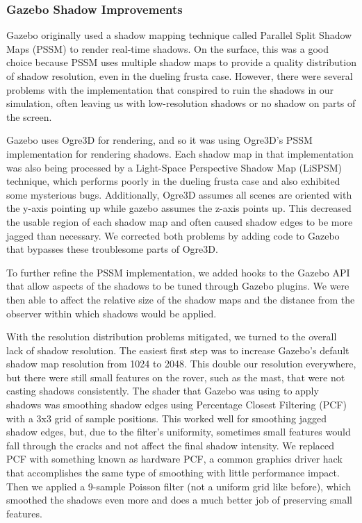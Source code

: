 \documentclass[twocolumn,letterpaper]{IEEEAerospaceCLS}  %
\begin{document}
\subsubsection{Gazebo Shadow Improvements}
Gazebo originally used a shadow mapping technique called Parallel Split Shadow Maps (PSSM) to render real-time shadows. On the surface, this was a good choice because PSSM uses multiple shadow maps to provide a quality distribution of shadow resolution, even in the dueling frusta case. However, there were several problems with the implementation that conspired to ruin the shadows in our simulation, often leaving us with low-resolution shadows or no shadow on parts of the screen.

Gazebo uses Ogre3D for rendering, and so it was using Ogre3D's PSSM implementation for rendering shadows. Each shadow map in that implementation was also being processed by a Light-Space Perspective Shadow Map (LiSPSM) technique, which performs poorly in the dueling frusta case and also exhibited some mysterious bugs. Additionally, Ogre3D assumes all scenes are oriented with the y-axis pointing up while gazebo assumes the z-axis points up. This decreased the usable region of each shadow map and often caused shadow edges to be more jagged than necessary. We corrected both problems by adding code to Gazebo that bypasses these troublesome parts of Ogre3D.

To further refine the PSSM implementation, we added hooks to the Gazebo API that allow aspects of the shadows to be tuned through Gazebo plugins. We were then able to affect the relative size of the shadow maps and the distance from the observer within which shadows would be applied.

With the resolution distribution problems mitigated, we turned to the overall lack of shadow resolution. The easiest first step was to increase Gazebo's default shadow map resolution from 1024 to 2048. This double our resolution everywhere, but there were still small features on the rover, such as the mast, that were not casting shadows consistently. The shader that Gazebo was using to apply shadows was smoothing shadow edges using Percentage Closest Filtering (PCF) with a 3x3 grid of sample positions. This worked well for smoothing jagged shadow edges, but, due to the filter's uniformity, sometimes small features would fall through the cracks and not affect the final shadow intensity. We replaced PCF with something known as hardware PCF, a common graphics driver hack that accomplishes the same type of smoothing with little performance impact. Then we applied a 9-sample Poisson filter (not a uniform grid like before), which smoothed the shadows even more and does a much better job of preserving small features.
\end{document}
